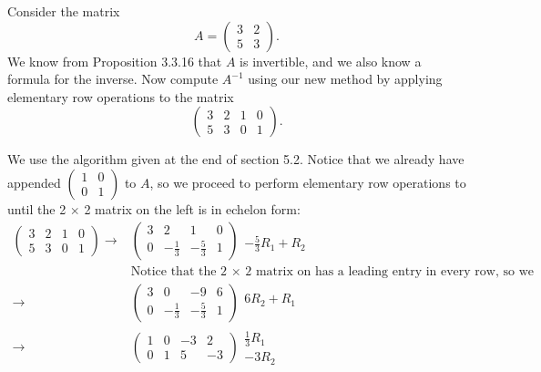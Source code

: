 \documentclass[12pt]{article}
\newenvironment{problem}[2][Problem]
{
	\begin{trivlist} 
		\item[\hskip \labelsep {\bfseries #1 #2:}]
	}
{
	\end{trivlist}
	}
\newenvironment{solution}[1][Solution]
{
	\begin{trivlist} 
		\item[\hskip \labelsep {\itshape #1:}]
	}
	{
	\end{trivlist}
}
\begin{document}
\begin{problem}{1}
Consider the matrix
\[
A=\begin{pmatrix} 3&2\\5&3\end{pmatrix}\text{.}
\]
We know from Proposition 3.3.16 that $A$ is invertible, and we also know a formula for the inverse. Now compute $A^{-1}$ using our new method by applying elementary row operations to the matrix
\[
\begin{pmatrix} 3&2&1&0\\5&3&0&1\end{pmatrix}\text{.}
\]
\noindent
\newline
\newline
\begin{solution}
We use the algorithm given at the end of section 5.2. Notice that we already have appended $\begin{pmatrix} 1&0\\0&1 \end{pmatrix}$ to $A$, so we proceed to perform elementary row operations to until the 2 $\times$ 2 matrix on the left is in echelon form:
\begin{align*}
\begin{pmatrix} 3&2&1&0\\5&3&0&1\end{pmatrix} \rightarrow & \begin{pmatrix} 3&2&1&0\\0&-\frac{1}{3}&-\frac{5}{3}&1\end{pmatrix} \begin{matrix} \text{} \\ -\frac{5}{3} R_1 + R_2 \text{}\end{matrix} \\
&\text{Notice that the 2 $\times$ 2 matrix on has a leading entry in every row, so we continue to step 4:}\\
\rightarrow & \begin{pmatrix} 3&0&-9&6\\0&-\frac{1}{3}&-\frac{5}{3}&1\end{pmatrix} \begin{matrix} 6R_2 + R_1 \text{} \\ \text{}\end{matrix} \\
\rightarrow & \begin{pmatrix} 1&0&-3&2\\0&1&5&-3\end{pmatrix} \begin{matrix} \frac{1}{3}R_1 \text{} \\ -3R_2\text{}\end{matrix}

\end{align*}
\end{solution}
\end{problem}
\end{document}
